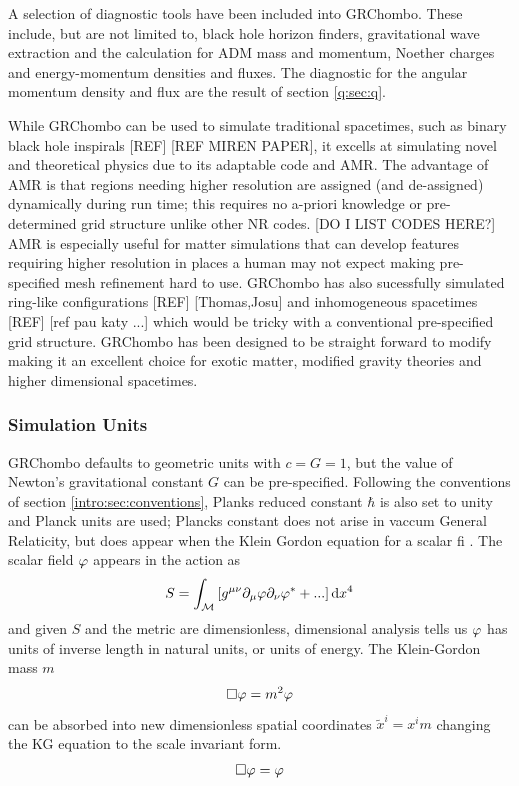 A selection of diagnostic tools have been included into GRChombo. These include, but are not limited to, black hole horizon finders, gravitational wave extraction and the calculation for ADM mass and momentum, Noether charges and energy-momentum densities and fluxes. The diagnostic for the angular momentum density and flux are the result of section \ref{q:sec:q}.


While GRChombo can be used to simulate traditional spacetimes, such as binary black hole inspirals [REF] [REF MIREN PAPER], it excells at simulating novel and theoretical physics due to its adaptable code and AMR. The advantage of AMR is that regions needing higher resolution are assigned (and de-assigned) dynamically during run time; this requires no a-priori knowledge or pre-determined grid structure unlike other NR codes. [DO I LIST CODES HERE?] AMR is especially useful for matter simulations that can develop features requiring higher resolution in places a human may not expect making pre-specified mesh refinement hard to use. GRChombo has also sucessfully simulated ring-like configurations [REF] [Thomas,Josu] and inhomogeneous spacetimes [REF] [ref pau katy ...] which would be tricky with a conventional pre-specified grid structure. GRChombo has been designed to be straight forward to modify making it an excellent choice for exotic matter, modified gravity theories and higher dimensional spacetimes.


\subsubsection{Simulation Units}

GRChombo defaults to geometric units with $c=G=1$, but the value of Newton's gravitational constant $G$ can be pre-specified. Following the conventions of section \ref{intro:sec:conventions}, Planks reduced constant $\hbar$ is also set to unity and Planck units are used; Plancks constant does not arise in vaccum General Relaticity, but does appear when the Klein Gordon equation for a scalar fi . The scalar field $\varphi$ appears in the action as
\begin{equation} S = \int_{\mathcal{M}} \left[g^{\mu\nu}\partial_\mu \varphi \partial_\nu \varphi^* + ... \right]\dd x^4\end{equation}
and given $S$ and the metric are dimensionless, dimensional analysis tells us $\varphi$ has units of inverse length in natural units, or units of energy. The Klein-Gordon mass $m$
\begin{equation} \Box \varphi = m^2 \varphi\end{equation}
can be absorbed into new dimensionless spatial coordinates $\tilde{x}^i = x^i m$ changing the KG equation to the scale invariant form.
\begin{equation} \Box \varphi = \varphi\end{equation}




